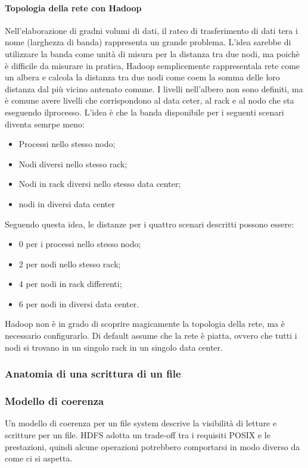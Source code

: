 \documentclass{article}
\begin{document}
\paragraph{Topologia della rete con Hadoop} Nell'elaborazione di gradni volumi di dati, il rateo di trasferimento di dati tera i nome (larghezza di banda) rappresenta un grande problema. L'idea sarebbe di utilizzare la banda come unità di misura per la distanza tra due nodi, ma poichè è difficile da misurare in pratica, Hadoop semplicemente rappresentala rete come un albera e calcola la distanza tra due nodi come coem la somma delle loro distanza dal più vicino antenato comune. I livelli nell'albero non sono definiti, ma è comune avere livelli che corrispondono al data ceter, al rack e al nodo che sta eseguendo ilprocesso. L'idea è che la banda disponibile per i seguenti scenari diventa semrpe meno:
\begin{itemize}
    \item Processi nello stesso nodo;
    \item Nodi diversi nello stesso rack;
    \item Nodi in rack diversi nello stesso data center;
    \item nodi in diversi data center
\end{itemize}

\noindent Seguendo questa idea, le distanze per i quattro scenari descritti possono essere:
\begin{itemize}
    \item 0 per i processi nello stesso nodo;
    \item 2 per nodi nello stesso rack;
    \item 4 per nodi in rack differenti;
    \item 6 per nodi in diversi data center.
\end{itemize}

\noindent Hadoop non è in grado di scoprire magicamente la topologia della rete, ma è necessario configurarlo. Di default assume che la rete è piatta, ovvero che tutti i nodi si trovano in un singolo rack in un singolo data center.

\subsubsection{Anatomia di una scrittura di un file}


\subsubsection{Modello di coerenza}
Un modello di coerenza per un file system descrive la visibilità di letture e scritture per un file. HDFS adotta un trade-off tra i requisiti POSIX e le prestazioni, quindi alcune operazioni potrebbero comportarsi in modo diverso da come ci si aspetta.
\end{document}
